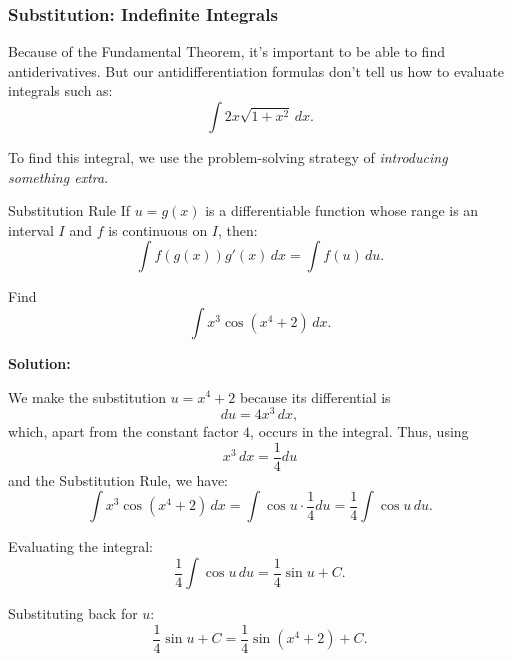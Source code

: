 \documentclass[12pt]{article}
\theoremstyle{beautifulthm}
\begin{document}
\subsubsection{Substitution: Indefinite Integrals}
Because of the Fundamental Theorem, it’s important to be able to find antiderivatives. But our antidifferentiation formulas don’t tell us how to evaluate integrals such as:
\[
\int 2x \sqrt{1 + x^2} \, dx.
\]

To find this integral, we use the problem-solving strategy of \textit{introducing something extra}. 

\begin{mytheorem}{Substitution Rule}{}
    If $u = g(x)$ is a differentiable function whose range is an interval $I$ and $f$ is continuous on $I$, then:
\[
\int f(g(x)) g'(x) \, dx = \int f(u) \, du.
\]
\end{mytheorem}

\begin{tcolorbox}[colback=examplebg, colframe=red!75!black, title=\textbf{EXAMPLE 1: Find the Integral of the Function}, fonttitle=\bfseries, sharp corners]
Find 
\[
\int x^3 \cos(x^4 + 2) \, dx.
\]


\tcblower
\textbf{Solution:} 

We make the substitution $u = x^4 + 2$ because its differential is 
\[
du = 4x^3 \, dx,
\]
which, apart from the constant factor $4$, occurs in the integral. Thus, using 
\[
x^3 \, dx = \frac{1}{4} du
\]
and the Substitution Rule, we have:
\[
\int x^3 \cos(x^4 + 2) \, dx = \int \cos u \cdot \frac{1}{4} du = \frac{1}{4} \int \cos u \, du.
\]

Evaluating the integral:
\[
\frac{1}{4} \int \cos u \, du = \frac{1}{4} \sin u + C.
\]

Substituting back for $u$:
\[
\frac{1}{4} \sin u + C = \frac{1}{4} \sin(x^4 + 2) + C.
\]



\end{tcolorbox}
\end{document}
